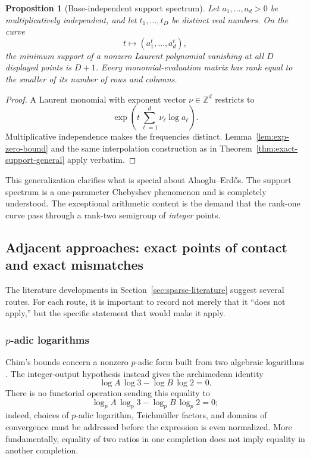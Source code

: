 \documentclass[11pt,oneside]{article}
\newtheorem{proposition}[theorem]{Proposition}
\theoremstyle{definition}
\theoremstyle{remark}
\newcommand{\Z}{\mathbb Z}
\begin{document}
\begin{proposition}[Base-independent support spectrum]
\label{prop:base-independent-support}
Let $a_1,\dots,a_d>0$ be multiplicatively independent, and let
$t_1,\dots,t_D$ be distinct real numbers.  On the curve
\[
  t\longmapsto(a_1^t,\dots,a_d^t),
\]
the minimum support of a nonzero Laurent polynomial vanishing at all $D$ displayed points is
$D+1$.  Every monomial-evaluation matrix has rank equal to the smaller of its number of rows
and columns.
\end{proposition}

\begin{proof}
A Laurent monomial with exponent vector $\nu\in\Z^d$ restricts to
\[
  \exp\!\left(t\sum_{\ell=1}^d\nu_\ell\log a_\ell\right).
\]
Multiplicative independence makes the frequencies distinct.  Lemma~\ref{lem:exp-zero-bound}
and the same interpolation construction as in Theorem~\ref{thm:exact-support-general} apply
verbatim.
\end{proof}

This generalization clarifies what is special about Alaoglu--Erd\H{o}s.  The support spectrum
is a one-parameter Chebyshev phenomenon and is completely understood.  The exceptional
arithmetic content is the demand that the rank-one curve pass through a rank-two semigroup of
\emph{integer} points.

\subsection{Adjacent approaches: exact points of contact and exact mismatches}
\label{sec:sparse-adjacent}

The literature developments in Section~\ref{sec:sparse-literature} suggest several routes.
For each route, it is important to record not merely that it ``does not apply,'' but the
specific statement that would make it apply.

\subsubsection{$p$-adic logarithms}

Chim's bounds concern a nonzero $p$-adic form built from two algebraic logarithms
\cite{Chim2025}.  The integer-output hypothesis instead gives the archimedean identity
\[
  \log A\,\log3-\log B\,\log2=0.
\]
There is no functorial operation sending this equality to
\[
  \log_p A\,\log_p3-\log_p B\,\log_p2=0;
\]
indeed, choices of $p$-adic logarithm, Teichm\"uller factors, and domains of convergence must
be addressed before the expression is even normalized.  More fundamentally, equality of two
ratios in one completion does not imply equality in another completion.
\end{document}
